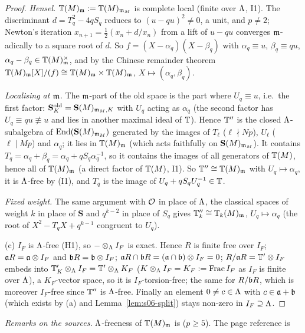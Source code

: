 \begin{proof}
\emph{Hensel.} $\mathbb{T}(M)_{\mathfrak{m}}:=\mathbb{T}(M)_{\mathfrak{m}_M}$ is complete local (finite over $\Lambda$, I1). The discriminant $d=T_q^2-4qS_q$ reduces to
$(u-qu)^2\ne0$, a unit, and $p\ne2$; Newton's iteration $x_{n+1}=\tfrac12(x_n+d/x_n)$ from a lift of $u-qu$ converges $\mathfrak{m}$-adically to a
square root of $d$. So $f=(X-\alpha_q)(X-\beta_q)$ with $\alpha_q\equiv u$, $\beta_q\equiv qu$, $\alpha_q-\beta_q\in\mathbb{T}(M)_{\mathfrak{m}}^\times$, and by the
Chinese remainder theorem $\mathbb{T}(M)_{\mathfrak{m}}[X]/(f)\cong\mathbb{T}(M)_{\mathfrak{m}}\times\mathbb{T}(M)_{\mathfrak{m}}$, $X\mapsto(\alpha_q,\beta_q)$.

\emph{Localising at $\mathfrak{m}$.} The $\mathfrak{m}$-part of the old space is the part where $U_q\equiv u$, i.e.\ the first factor:
$\mathbf S^{\rm old}_K=\mathbf S(M)_{\mathfrak{m}_M,K}$ with $U_q$ acting as $\alpha_q$ (the second factor has $U_q\equiv qu\not\equiv u$ and lies in
another maximal ideal of $\mathbb{T}$). Hence $\mathbb{T}''$ is the closed $\Lambda$-subalgebra of $\operatorname{End}(\mathbf S(M)_{\mathfrak{m}_M})$ generated by the images of
$T_\ell$ ($\ell\nmid Np$), $U_\ell$ ($\ell\mid Mp$) and $\alpha_q$; it lies in $\mathbb{T}(M)_{\mathfrak{m}}$ (which acts faithfully on $\mathbf S(M)_{\mathfrak{m}_M}$). It
contains $T_q=\alpha_q+\beta_q=\alpha_q+qS_q\alpha_q^{-1}$, so it contains the images of all generators of $\mathbb{T}(M)$, hence all of
$\mathbb{T}(M)_{\mathfrak{m}}$ (a direct factor of $\mathbb{T}(M)$, I1). So $\mathbb{T}''\cong\mathbb{T}(M)_{\mathfrak{m}}$ with $U_q\mapsto\alpha_q$, it is $\Lambda$-free by (I1), and $T_q$ is the
image of $U_q+qS_qU_q^{-1}\in\mathbb{T}$.

\emph{Fixed weight.} The same argument with $\mathcal{O}$ in place of $\Lambda$, the classical spaces of weight $k$ in place of $\mathbf S$ and
$q^{k-2}$ in place of $S_q$ gives $\mathbb{T}''_k\cong\mathbb{T}_k(M)_{\mathfrak{m}}$, $U_q\mapsto\alpha_q$ (the root of $X^2-T_qX+q^{k-1}$ congruent to $U_q$).

(c) $I_F$ is $\Lambda$-free (H1), so $-\otimes_\Lambda I_F$ is exact. Hence $R$ is finite free over $I_F$; $\mathfrak{a} R=\mathfrak{a}\otimes I_F$ and
$\mathfrak{b} R=\mathfrak{b}\otimes I_F$; $\mathfrak{a} R\cap\mathfrak{b} R=(\mathfrak{a}\cap\mathfrak{b})\otimes I_F=0$; $R/\mathfrak{a} R=\mathbb{T}'\otimes I_F$ embeds into $\mathbb{T}'_K\otimes_\Lambda I_F=\mathbb{T}'\otimes_\Lambda
K_F$ ($K\otimes_\Lambda I_F=K_F:=\mathrm{Frac}\,I_F$ as $I_F$ is finite over $\Lambda$), a $K_F$-vector space, so it is $I_F$-torsion-free; the
same for $R/\mathfrak{b} R$, which is moreover $I_F$-free since $\mathbb{T}''$ is $\Lambda$-free. Finally an element $0\ne c\in\Lambda$ with $c\in\mathfrak{a}+\mathfrak{b}$
(which exists by (a) and Lemma~\ref{lem:s06-split}) stays non-zero in $I_F\supseteq\Lambda$.
\end{proof}
\noindent\emph{Remarks on the sources.} $\Lambda$-freeness of $\mathbb{T}(M)_{\mathfrak{m}}$ is \cite[Thm~3.1]{Hi86b}
 ($p\ge5$). The page reference is
